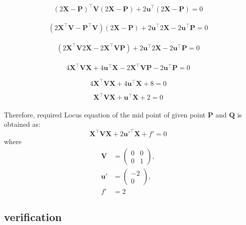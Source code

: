 \documentclass[journal,10pt,twocolumn]{article}
\newcommand{\myvec}[1]{\ensuremath{\begin{pmatrix}#1\end{pmatrix}}}
\let\vec\mathbf
\let\vec\mathbf
\begin{document}
\begin{multline}
    (2\vec{X}-\vec{P})^{\top}\vec{V}(2\vec{X}-\vec{P})+2\vec{u}^{\top}(2\vec{X}-\vec{P})=0
     \label{eq-8}
    \end{multline}

\begin{multline}
    \label{eq:conic_quad_form}
    (2\vec{X}^{\top}\vec{V}-\vec{P}^{\top}\vec{V})(2\vec{X}-\vec{P})+2\vec{u}^{\top}2\vec{X}-2\vec{u}^{\top}\vec{P}=0
    \end{multline}

\begin{multline}
    \label{eq:conic_quad_form}
    (2\vec{X}^{\top}\vec{V}2\vec{X}-2\vec{X}^{\top}\vec{V}\vec{P})+2\vec{u}^{\top}2\vec{X}-2\vec{u}^{\top}\vec{P}=0
    \end{multline}
 
\begin{multline}
    \label{eq:conic_quad_form}
    4\vec{X}^{\top}\vec{V}\vec{X}+4\vec{u}^{\top}\vec{X}-2\vec{X}^{\top}\vec{V}\vec{P}-2\vec{u}^{\top}\vec{P}=0
    \end{multline}
        
\begin{equation}
    \label{eq:conic_quad_form}
    4\vec{X}^{\top}\vec{V}\vec{X}+4\vec{u}^{\top}\vec{X}+8=0
    \end{equation}

\begin{equation}
    \label{eq:conic_quad_form}
    \vec{X}^{\top}\vec{V}\vec{X}+\vec{u}^{\top}\vec{X}+2=0
    \end{equation}
\\
Therefore, required Locus equation of the mid point of given point $\vec{P}$ and $\vec{Q}$ is obtained as:
\begin{equation}
    \label{eq-13}
    \vec{X}^{\top}\vec{V}\vec{X}+2\vec{u'}^{\top}\vec{X}+f'=0
    \end{equation}
where
\begin{align}
	\label{eq:V_matrix}
	\vec{V} &= \myvec{0 & 0\\0 & 1},
	\\
	\label{eq:u_vector}
	\vec{u'} &= \myvec{-2\\0},
	\\
	\label{eq:f_value}
	f' &= 2
\end{align}
 \subsection{verification}
\end{document}

